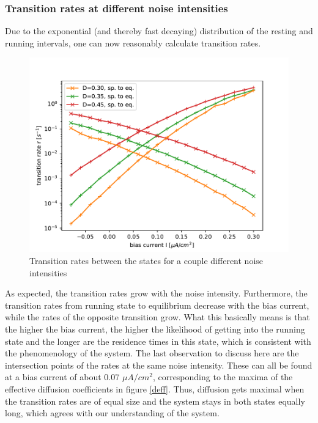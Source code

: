 \documentclass[12pt,a4paper]{article}
\begin{document}
\subsubsection{Transition rates at different noise intensities}
Due to the exponential (and thereby fast decaying) distribution of the resting and running intervals, one can now reasonably calculate transition rates.
\begin{figure}[H]
	\centering
	\includegraphics[scale=1]{tranratesneur32.pdf}\caption{Transition rates between the states for a couple different noise intensities}
	\label{tranrateneur}
\end{figure}
As expected, the transition rates grow with the noise intensity. Furthermore, the transition rates from running state to equilibrium decrease with the bias current, while the rates of the opposite transition grow. What this basically means is that the higher the bias current, the higher the likelihood of getting into the running state and the longer are the residence times in this state, which is consistent with the phenomenology of the system. The last observation to discuss here are the intersection points of the rates at the same noise intensity. These can all be found at a bias current of about 0.07 $\mu A/cm^2$, corresponding to the maxima of the effective diffusion coefficients in figure \ref{deff}. Thus, diffusion gets maximal when the transition rates are of equal size and the system stays in both states equally long, which agrees with our understanding of the system.
\end{document}
